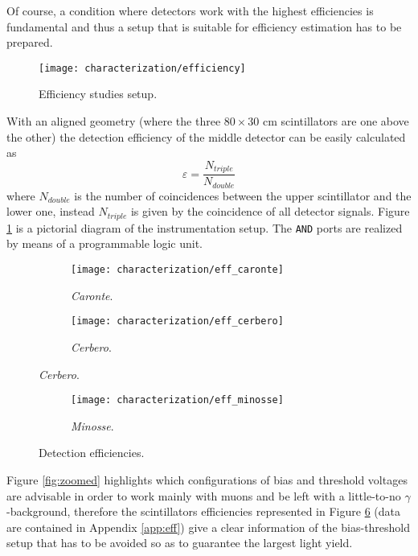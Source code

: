 Of course, a condition where detectors work with the highest efficiencies is fundamental and thus a setup that is suitable for efficiency estimation has to be prepared.
\begin{figure}[!h]
	\centering
	\texttt{[image: characterization/efficiency]}
	\caption{Efficiency studies setup.}
	\label{fig:eff-setup}
\end{figure}
With an aligned geometry (where the three $80\times 30$ cm scintillators are one above the other) the detection efficiency of the middle detector can be easily calculated as
\begin{equation}
\varepsilon = \frac{N_{triple}}{N_{double}}
\end{equation}
where $N_{double}$ is the number of coincidences between the upper scintillator and the lower one, instead $N_{triple}$ is given by the coincidence of all detector signals. Figure \ref{fig:eff-setup} is a pictorial diagram of the instrumentation setup. The \texttt{AND} ports are realized by means of a programmable logic unit.\\
\begin{figure}[!bp]
	\centering
	\begin{subfigure}{.5\linewidth}
		\centering
		\texttt{[image: characterization/eff\_caronte]}
		\caption{\emph{Caronte}.} 
		\label{subfig:eff_caronte}
	\end{subfigure}\hfill
	\begin{subfigure}{.5\linewidth}
		\centering
		\texttt{[image: characterization/eff\_cerbero]}
		\caption{\emph{Cerbero}.} 
		\label{subfig:eff_cerbero}
	\end{subfigure}\hfill
\end{figure}
\begin{figure}[!ht]
	\centering
	\ContinuedFloat
	\begin{subfigure}{.5\linewidth}
	\centering
	\texttt{[image: characterization/eff\_minosse]}
	\caption{\emph{Minosse}.} 
	\label{subfig:eff_minosse}
	\end{subfigure}
	\caption{Detection efficiencies.} 
	\label{fig:eff}
\end{figure}

Figure \ref{fig:zoomed} highlights which configurations of bias and threshold voltages are advisable in order to work mainly with muons and be left with a little-to-no $\gamma$-background, therefore the scintillators efficiencies represented in Figure \ref{fig:eff}  (data are contained in Appendix \ref{app:eff}) give a clear information of the bias-threshold setup that has to be avoided so as to guarantee the largest light yield.\\

